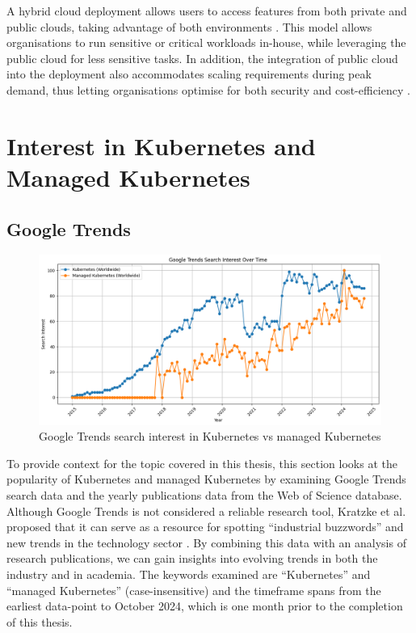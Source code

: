 A hybrid cloud deployment allows users to access features from both private and public clouds, taking advantage of both environments \cite{jadejaCloudComputingConcepts2012, dash2016governance}. This model allows organisations to run sensitive or critical workloads in-house, while leveraging the public cloud for less sensitive tasks. In addition, the integration of public cloud into the deployment also accommodates scaling requirements during peak demand, thus letting organisations optimise for both security and cost-efficiency \cite{huangAchievingBigData2014}.




\section{Interest in Kubernetes and Managed Kubernetes}

\subsection{Google Trends}

\FloatBarrier  

\begin{figure}
    \centering
    \includegraphics[width=1\linewidth]{resources/d2a89eeeda76d50039bc6f5d3a97c41b.png}
    \caption{Google Trends search interest in Kubernetes vs managed Kubernetes}
    \label{fig:search-interests-kubernetes-vs-managed-kubernetes}
\end{figure}

To provide context for the topic covered in this thesis, this section looks at the popularity of Kubernetes and managed Kubernetes by examining Google Trends search data and the yearly publications data from the Web of Science database. Although Google Trends is not considered a reliable research tool, Kratzke et al. proposed that it can serve as a resource for spotting “industrial buzzwords” and new trends in the technology sector \cite{kratzkeUnderstandingCloudnativeApplications2017}. By combining this data with an analysis of research publications, we can gain insights into evolving trends in both the industry and in academia. The keywords examined are “Kubernetes” and “managed Kubernetes” (case-insensitive) and the timeframe spans from the earliest data-point to October 2024, which is one month prior to the completion of this thesis.


